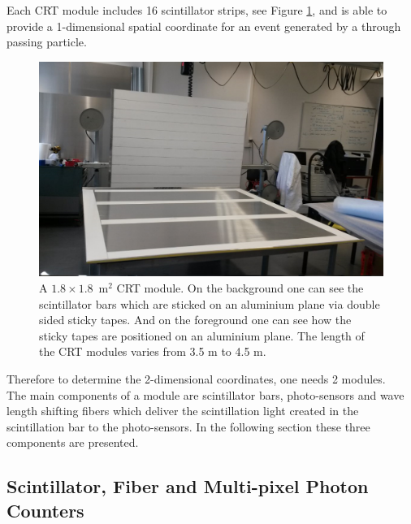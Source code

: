 \documentclass[a4paper]{article}\linespread{1.4}
\begin{document}
Each CRT module includes 16 scintillator strips, see Figure \ref{fig:tapes}, and is able to provide a 1-dimensional spatial coordinate for an event generated by a through passing particle.%
\begin{figure}[h!] \centering \includegraphics[width=120mm,scale=2.0]{tapespaint.png} \caption{A $1.8\times 1.8$~$\mathrm{m^{2}}$ CRT module. On the background one can see the scintillator bars which are sticked on an aluminium plane via double sided sticky tapes. And on the foreground one can see how the sticky tapes are positioned on an aluminium plane. The length of the CRT modules varies from 3.5 m to 4.5 m.}  \label{fig:tapes}\end{figure}
Therefore to determine the 2-dimensional coordinates, one needs 2 modules. 
\\The main components of a module are scintillator bars, photo-sensors and wave length shifting fibers which deliver the scintillation light created in the scintillation bar to the photo-sensors. In the following section these three components are presented.

\subsection{Scintillator, Fiber and Multi-pixel Photon Counters}
\label{chap:scifib}
\end{document}
